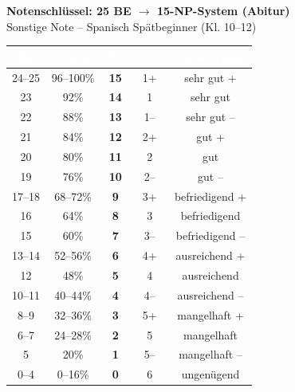 \documentclass[11pt, a4paper]{article}
\begin{document}
\newpage


\begin{center}
{\Large\bfseries Notenschlüssel: 25 BE $\rightarrow$ 15-NP-System (Abitur)}\\[0.5cm]
{\small Sonstige Note -- Spanisch Spätbeginner (Kl. 10--12)}
\end{center}

\vspace{1cm}

\begin{center}
\begin{tabular}{|c|c|c|c|c|}
\hline
\rowcolor{spanisch}
\textcolor{white}{\textbf{BE}} & \textcolor{white}{\textbf{Prozent}} & \textcolor{white}{\textbf{NP}} & \textcolor{white}{\textbf{Note}} & \textcolor{white}{\textbf{Bewertung}} \\
\hline
\hline
24--25 & 96--100\% & \textbf{15} & 1+ & sehr gut + \\
\hline
23 & 92\% & \textbf{14} & 1 & sehr gut \\
\hline
22 & 88\% & \textbf{13} & 1-- & sehr gut -- \\
\hline
\rowcolor{hellgrau}
21 & 84\% & \textbf{12} & 2+ & gut + \\
\hline
\rowcolor{hellgrau}
20 & 80\% & \textbf{11} & 2 & gut \\
\hline
\rowcolor{hellgrau}
19 & 76\% & \textbf{10} & 2-- & gut -- \\
\hline
17--18 & 68--72\% & \textbf{9} & 3+ & befriedigend + \\
\hline
16 & 64\% & \textbf{8} & 3 & befriedigend \\
\hline
15 & 60\% & \textbf{7} & 3-- & befriedigend -- \\
\hline
\rowcolor{hellgrau}
13--14 & 52--56\% & \textbf{6} & 4+ & ausreichend + \\
\hline
\rowcolor{hellgrau}
12 & 48\% & \textbf{5} & 4 & ausreichend \\
\hline
\rowcolor{hellgrau}
10--11 & 40--44\% & \textbf{4} & 4-- & ausreichend -- \\
\hline
8--9 & 32--36\% & \textbf{3} & 5+ & mangelhaft + \\
\hline
6--7 & 24--28\% & \textbf{2} & 5 & mangelhaft \\
\hline
5 & 20\% & \textbf{1} & 5-- & mangelhaft -- \\
\hline
\rowcolor{red!10}
0--4 & 0--16\% & \textbf{0} & 6 & ungenügend \\
\hline
\end{tabular}
\end{center}
\end{document}
